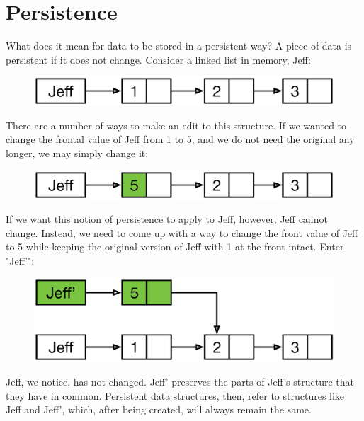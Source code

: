 \documentclass[preprint]{sigplanconf}
\begin{document}
\section{Persistence}
What does it mean for data to be stored in a persistent way?
A piece of data is persistent if it does not change.
Consider a linked list in memory, Jeff:
\begin{figure}[H]
\includegraphics[scale=.35]{linkedlist}
\centering
\end{figure}
There are a number of ways to make an edit to this structure.
If we wanted to change the frontal value of Jeff from 1 to 5, and we do not need the original any longer, we may simply change it:
\begin{figure}[H]
\includegraphics[scale=.35]{linkedlist2}
\centering
\end{figure}
If we want this notion of persistence to apply to Jeff, however, Jeff cannot change.
Instead, we need to come up with a way to change the front value of Jeff to 5 while keeping the original version of Jeff with 1 at the front intact.
Enter "Jeff'":
\begin{figure}[H]
\includegraphics[scale=.35]{linkedlist3}
\centering
\end{figure}
Jeff, we notice, has not changed.
Jeff' preserves the parts of Jeff's structure that they have in common.
Persistent data structures, then, refer to structures like Jeff and Jeff', which, after being created, will always remain the same.
\end{document}
